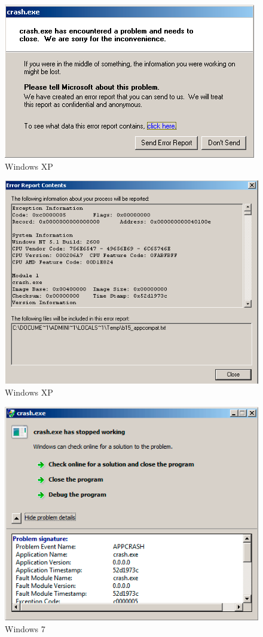 \begin{figure}[H]
\centering
\includegraphics[scale=0.66]{OS-specific/SEH/1/crash_xp1.png}
\caption{Windows XP}
\end{figure}

\begin{figure}[H]
\centering
\includegraphics[scale=0.66]{OS-specific/SEH/1/crash_xp2.png}
\caption{Windows XP}
\end{figure}

\begin{figure}[H]
\centering
\includegraphics[scale=0.66]{OS-specific/SEH/1/crash_win7.png}
\caption{Windows 7}
\end{figure}

